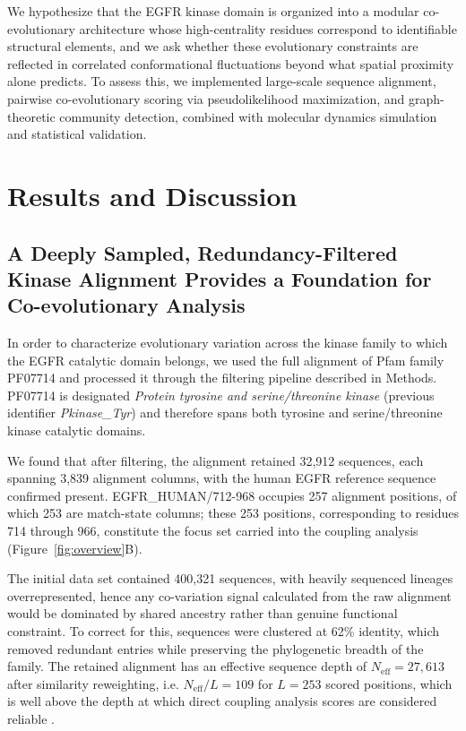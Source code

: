 \documentclass[utf8]{FrontiersinHarvard}
\begin{document}
We hypothesize that the EGFR kinase domain is organized into a modular co-evolutionary architecture whose high-centrality residues correspond to identifiable structural elements, and we ask whether these evolutionary constraints are reflected in correlated conformational fluctuations beyond what spatial proximity alone predicts. To assess this, we implemented large-scale sequence alignment, pairwise co-evolutionary scoring via pseudolikelihood maximization, and graph-theoretic community detection, combined with molecular dynamics simulation and statistical validation.

\section{Results and Discussion}

\subsection{A Deeply Sampled, Redundancy-Filtered Kinase Alignment Provides a Foundation for Co-evolutionary Analysis}

In order to characterize evolutionary variation across the kinase family to which the EGFR catalytic domain belongs, we used the full alignment of Pfam family PF07714 and processed it through the filtering pipeline described in Methods. PF07714 is designated \emph{Protein tyrosine and serine/threonine kinase} (previous identifier \emph{Pkinase\_Tyr}) and therefore spans both tyrosine and serine/threonine kinase catalytic domains.

We found that after filtering, the alignment retained 32,912 sequences, each spanning 3,839 alignment columns, with the human EGFR reference sequence confirmed present. EGFR\_HUMAN/712-968 occupies 257 alignment positions, of which 253 are match-state columns; these 253 positions, corresponding to residues 714 through 966, constitute the focus set carried into the coupling analysis (Figure~\ref{fig:overview}B).

The initial data set contained 400,321 sequences, with heavily sequenced lineages overrepresented, hence any co-variation signal calculated from the raw alignment would be dominated by shared ancestry rather than genuine functional constraint. To correct for this, sequences were clustered at 62\% identity, which removed redundant entries while preserving the phylogenetic breadth of the family. The retained alignment has an effective sequence depth of $N_{\mathrm{eff}} = 27{,}613$ after similarity reweighting, i.e. $N_{\mathrm{eff}}/L = 109$ for $L = 253$ scored positions, which is well above the depth at which direct coupling analysis scores are considered reliable \citep{Ekeberg2013}.
\end{document}
